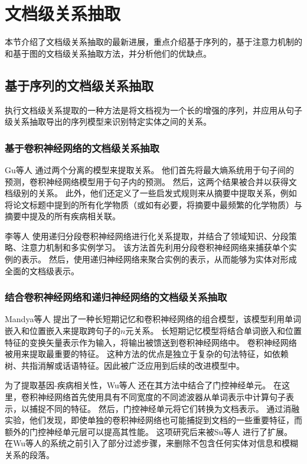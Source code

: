 \documentclass[bachelor]{thesis-uestc}
\begin{document}
\section{文档级关系抽取}
本节介绍了文档级关系抽取的最新进展，重点介绍基于序列的，基于注意力机制的和基于图的文档级关系抽取方法，并分析他们的优缺点。

\subsection{基于序列的文档级关系抽取}
执行文档级关系提取的一种方法是将文档视为一个长的增强的序列，并应用从句子级关系抽取导出的序列模型来识别特定实体之间的关系。

\subsubsection{基于卷积神经网络的文档级关系抽取}
Gu等人 \cite{10.1093/database/bax024}通过两个分离的模型来提取关系。
他们首先将最大熵系统用于句子间的预测，卷积神经网络模型用于句子内的预测。
然后，这两个结果被合并以获得文档级别的关系。
此外，他们还定义了一些启发式规则来从摘要中提取关系，例如将论文标题中提到的所有化学物质（或如有必要，将摘要中最频繁的化学物质）与摘要中提及的所有疾病相关联。\par

李等人 \cite{li2018chemical}
使用递归分段卷积神经网络进行化关系提取，并结合了领域知识、分段策略、注意力机制和多实例学习。
该方法首先利用分段卷积神经网络来捕获单个实例的表示。
然后，使用递归神经网络来聚合实例的表示，从而能够为实体对形成全面的文档级表示。

\subsubsection{结合卷积神经网络和递归神经网络的文档级关系抽取}
Mandya等人 \cite{mandya2018combining}提出了一种长短期记忆和卷积神经网络的组合模型，该模型利用单词嵌入和位置嵌入来提取跨句子的$n$元关系。
长短期记忆模型将结合单词嵌入和位置特征的变换矢量表示作为输入，将输出被馈送到卷积神经网络中。
卷积神经网络被用来提取最重要的特征。
这种方法的优点是独立于复杂的句法特征，如依赖树、共指消解或话语特征。因此被广泛应用到后续的改进模型中。

为了提取基因-疾病相关性，Wu等人 \cite{wu2019renet}还在其方法中结合了门控神经单元。
在这里，卷积神经网络首先使用具有不同宽度的不同滤波器从单词表示中计算句子表示，以捕捉不同的特征。
然后，门控神经单元将它们转换为文档表示。
通过消融实验，他们发现，即使单独的卷积神经网络也可能捕捉到文档的一些重要特征，而额外的门控神经单元层可以提高其性能。
这项研究后来被Su等人 \cite{renet2} 进行了扩展。
在Wu等人的系统之前引入了部分过滤步骤，来删除不包含任何实体对信息和模糊关系的段落。
\end{document}
